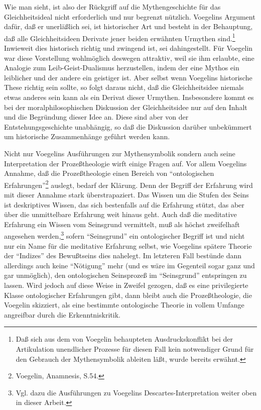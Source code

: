 Wie man sieht, ist also der Rückgriff auf die Mythengeschichte für das
Gleichheitsideal nicht erforderlich und nur begrenzt nützlich. Voegelins
Argument dafür, daß er unerläßlich sei, ist historischer Art und besteht in
der Behauptung, daß alle Gleichheitsideen Derivate jener beiden erwähnten
Urmythen sind.\footnote{Daß sich aus dem von Voegelin behaupteten
  Ausdruckskonflikt bei der Artikulation unendlicher Prozesse für diesen Fall
  kein notwendiger Grund für den Gebrauch der Mythensymbolik ableiten läßt,
  wurde bereits erwähnt.} Inwieweit dies historisch richtig und zwingend ist,
sei dahingestellt. Für Voegelin war diese Vorstellung wohlmöglich deswegen
attraktiv, weil sie ihm erlaubte, eine Analogie zum Leib-Geist-Dualismus
herzustellen, indem der eine Mythos ein leiblicher und der andere ein
geistiger ist. Aber selbst wenn Voegelins historische These richtig sein
sollte, so folgt daraus nicht, daß die Gleichheitsidee niemals etwas anderes
sein kann als ein Derivat dieser Urmythen. Insbesondere kommt es bei der
moralphilosophischen Diskussion der Gleichheitsidee nur auf den
Inhalt und die Begründung dieser Idee an. Diese sind aber von der
Entstehungsgeschichte unabhängig, so daß die Diskussion darüber unbekümmert um
historische Zusammenhänge geführt werden kann.

Nicht nur Voegelins Ausführungen zur Mythensymbolik sondern auch seine
Interpretation der Prozeßtheologie wirft einige Fragen auf. Vor allem
Voegelins Annahme, daß die Prozeßtheologie einen Bereich von
"`ontologischen Erfahrungen"'\footnote{Voegelin, Anamnesis, S.54.}
auslegt, bedarf der Klärung. Denn der Begriff der Erfahrung wird mit
dieser Annahme stark überstrapaziert. Das Wissen um die Stufen des Seins
ist deskriptives Wissen, das sich bestenfalls auf die Erfahrung stützt,
das aber über die unmittelbare Erfahrung weit hinaus geht. Auch daß die
meditative Erfahrung ein Wissen vom Seinsgrund vermittelt, muß als
höchst zweifelhaft angesehen werden,\footnote{Vgl. dazu die Ausführungen
  zu Voegelins Descartes-Interpretation weiter oben in dieser Arbeit.}
sofern "`Seinsgrund"' ein ontologischer Begriff ist und nicht nur ein
Name für die meditative Erfahrung selbst, wie Voegelins spätere Theorie
der "`Indizes"' des Bewußtseins dies nahelegt. Im letzteren Fall
bestünde dann allerdings auch keine "`Nötigung"' mehr (und es wäre im
Gegenteil sogar ganz und gar unmöglich), den ontologischen Seinsprozeß
im "`Seinsgrund"' entspringen zu lassen. Wird jedoch auf diese Weise in
Zweifel gezogen, daß es eine privilegierte Klasse ontologischer
Erfahrungen gibt, dann bleibt auch die Prozeßtheologie, die Voegelin
skizziert, als eine bestimmte ontologische Theorie in vollem Umfange
angreifbar durch die Erkenntniskritik.

